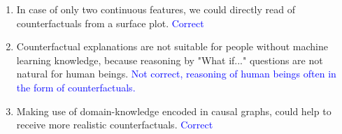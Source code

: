 {\begin{enumerate}
        \begin{enumerate}
        \item In case of only two continuous features, we could directly read of counterfactuals from a surface plot. 
        \textcolor{blue}{Correct}
        \item Counterfactual explanations are not suitable for people without machine learning knowledge, because reasoning by "What if..." questions are not natural for human beings. \textcolor{blue}{Not correct, reasoning of human beings often in the form of counterfactuals.}
         \item Making use of domain-knowledge encoded in causal graphs, could help to receive more realistic counterfactuals. \textcolor{blue}{Correct}
        \end{enumerate}
\end{enumerate}
}
